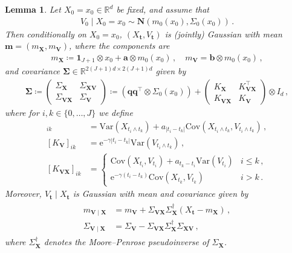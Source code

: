 \documentclass[12pt]{article}
\theoremstyle{plain}
\theoremstyle{plain}
\theoremstyle{remark}
\newcommand{\R}{\mathbb{R}}
\newcommand{\rme}{\mathrm{e}}
\newcommand*{\defeq}{\coloneqq}
\newcommand{\gauss}{\mathbf{N}}
\newcommand{\1}{\bm{1}}
\theoremstyle{plain}
\newtheorem{lemma}[theorem]{Lemma}
\theoremstyle{definition}
\theoremstyle{remark}
\begin{document}
\begin{lemma}\label{lem:condi_v_t_detailed}
Let $X_0 = x_0 \in \R^d$ be fixed, and assume that
\begin{align*}
    V_0 \mid X_0 = x_0 \sim {\gauss}(m_0(x_0), \Sigma_0(x_0))\,.
\end{align*}
Then conditionally on $X_0 = x_0$, $(X_{\bm t}, V_{\bm t})$ is (jointly) Gaussian with mean $\bm m = (m_{\bm X}, m_{\bm V})$, where the components are
\begin{align}
    m_{\bm X} \defeq \bm 1_{J+1} \otimes x_0 + \bm a \otimes m_0(x_0)\,,\quad m_{\bm V} = \bm b \otimes m_0(x_0)\,,
\end{align}
and covariance $\bm{\Sigma} \in \R^{2(J+1)d  \times 2(J+1)d}$ given by
\begin{align*}
    \bm{\Sigma} \defeq
    \begin{pmatrix}
\Sigma_{\bm X} &\Sigma_{\bm{XV}}\\
\Sigma_{\bm{VX}}&\Sigma_{\bm{V}}
\end{pmatrix} \defeq
({\bm{q}} {\bm{q}}^{\top} \otimes \Sigma_0(x_0))  + \begin{pmatrix}
K_{\bm X} &K_{\bm{VX}}^\top\\
K_{\bm{VX}} &K_{\bm V}
\end{pmatrix} \otimes I_d\,,
\end{align*}
where for $i,k \in \{0,\ldots,J\}$ we define
\begin{align*}
  [K_{\bm X}]_{ik} & = \mathrm{Var}(X_{t_i\wedge t_k}) + a_{|t_i-t_k|} \mathrm{Cov}(X_{t_i\wedge t_k}, V_{t_i\wedge t_k})\,, \\
[K_{\bm V}]_{ik}
  &= \rme^{-\gamma |t_i-t_k|} \mathrm{Var}(V_{t_i\wedge t_k})\,, \\
[K_{\bm{VX}}]_{ik}
  &    =              \begin{cases}
                    \mathrm{Cov}(X_{t_i},V_{t_i})
+
a_{t_k-t_i}\mathrm{Var}(V_{t_i}) & i \leq k\,, \\
\rme^{-\gamma(t_i-t_k)} \mathrm{Cov}(X_{t_k},V_{t_k}) & i >k \,.
                  \end{cases}
\end{align*}
Moreover, $V_{\bm t} \mid X_{\bm t}$ is Gaussian with mean and covariance given by
\begin{align}\label{eq:mean_cov_cond}
\begin{split}
m_{\bm V\mid \bm X} &= {m}_{\bm V} +
\Sigma_{\bm{VX}}\Sigma_{\bm X}^{\dagger}
(X_{\bm{t}}- m_{\bm X})\,, \\
\Sigma_{\bm V\mid \bm X}
&=
\Sigma_{\bm{V}}
-
\Sigma_{\bm{VX}}\Sigma_{\bm{X}}^\dagger\Sigma_{\bm{XV}}\,,
\end{split}
\end{align}
where $\Sigma_{\bm{X}}^{\dagger}$ denotes the Moore--Penrose pseudoinverse of $\Sigma_{\bm{X}}$.
\end{lemma}
\end{document}
